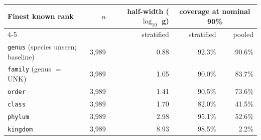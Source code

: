 \begin{tabular}{lrrrr}
\toprule
Finest known rank & $n$ & half-width ($\log_{10}$ g) & \multicolumn{2}{c}{coverage at nominal 90\%} \\
\cmidrule(l){4-5}
 & & stratified & stratified & pooled \\
\midrule
\texttt{genus} (species unseen; baseline) & 3{,}989 & 0.88 & 92.3\% & 90.6\% \\
\texttt{family} (genus $=$ UNK) & 3{,}989 & 1.05 & 90.0\% & 83.7\% \\
\texttt{order} & 3{,}989 & 1.41 & 90.5\% & 73.6\% \\
\texttt{class} & 3{,}989 & 1.70 & 82.0\% & 41.5\% \\
\texttt{phylum} & 3{,}989 & 2.98 & 95.1\% & 52.6\% \\
\texttt{kingdom} & 3{,}989 & 8.93 & 98.5\% & 2.2\% \\
\bottomrule
\end{tabular}
